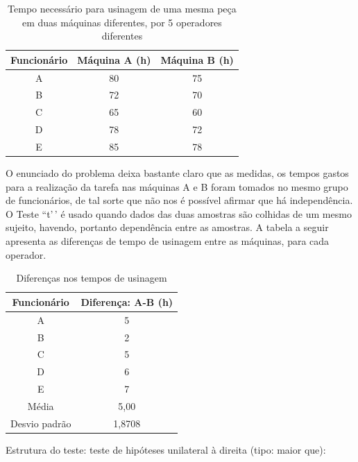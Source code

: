\documentclass[
]{book}
\begin{document}
\hfill\break

\begin{table}[h]
\centering
\caption{Tempo necessário para usinagem de uma mesma peça em duas máquinas diferentes, por 5 operadores diferentes} 
\begin{tabular}{|c|c|c|}
\hline 
Funcionário & Máquina A (h) & Máquina B (h) \\ 
\hline 
A & 80 & 75 \\ 
\hline 
B & 72 & 70 \\ 
\hline 
C & 65 & 60 \\ 
\hline 
D & 78 & 72 \\ 
\hline 
E & 85 & 78 \\ 
\hline 
\end{tabular} 
\end{table}

\hfill\break

O enunciado do problema deixa bastante claro que as medidas, os tempos gastos para a realização da tarefa nas máquinas A e B foram tomados no mesmo grupo de funcionários, de tal sorte que não nos é possível afirmar que há independência. O Teste ``t'\,' é usado quando dados das duas amostras são colhidas de um mesmo sujeito, havendo, portanto dependência entre as amostras. A tabela a seguir apresenta as diferenças de tempo de usinagem entre as máquinas, para cada operador.

\hfill\break

\begin{table}[h]
\centering
\caption{Diferenças nos tempos de usinagem}
    \begin{tabular}{|c|c|}
        \hline 
        Funcionário & Diferença: A-B (h) \\ 
        \hline 
        A & 5  \\ 
        \hline 
        B & 2 \\ 
        \hline 
        C & 5 \\ 
        \hline 
        D & 6  \\ 
        \hline 
        E & 7 \\ 
        \hline 
        Média & 5,00\\
        \hline
        Desvio padrão & 1,8708\\
        \hline
    \end{tabular} 
\end{table}

\hfill\break

Estrutura do teste: teste de hipóteses unilateral à direita (tipo: maior que):
\end{document}
